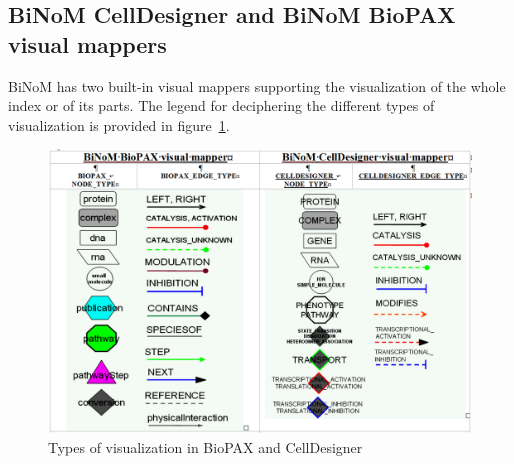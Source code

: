 \subsection{BiNoM CellDesigner and BiNoM BioPAX visual mappers}\label{CellDesigner_BioPAX_visual_mappers}
BiNoM has two built-in visual mappers supporting the visualization of the whole index or of its parts. The legend for deciphering the different types of visualization is provided in figure~\ref{BioPAX_visualizations}.
\begin{figure}
\centering
\includegraphics[width=14 cm]{graphics/BioPAX_visualizations}
\caption{Types of visualization in BioPAX and CellDesigner}
\label{BioPAX_visualizations}
\end{figure}

